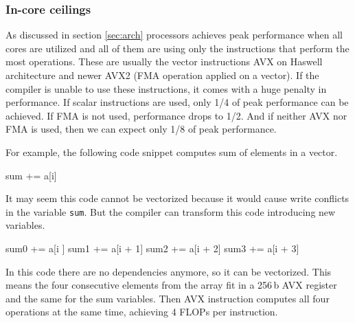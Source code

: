 \subsubsection*{In-core ceilings}


As discussed in section \ref{sec:arch} processors achieves peak performance when all cores are utilized and all of them are using only the instructions that perform the most operations. These are usually the vector instructions AVX on Haswell architecture and newer AVX2 (FMA operation applied on a vector).
If the compiler is unable to use these instructions, it comes with a huge penalty in performance. If scalar instructions are used, only 1/4 of peak performance can be achieved. If FMA is not used, performance drops to 1/2. And if neither AVX nor FMA is used, then we can expect only 1/8 of peak performance.


For example, the following code snippet computes sum of elements in a vector.
\begin{algorithmic}[1]
      \State sum += a[i]
  \EndFor
\end{algorithmic}%
It may seem this code cannot be vectorized because it would cause write conflicts in the variable \texttt{sum}.
But the compiler can transform this code introducing new variables.
\begin{algorithmic}[1]
      \State sum0 += a[i    ]
      \State sum1 += a[i + 1]
      \State sum2 += a[i + 2]
      \State sum3 += a[i + 3]
  \EndFor
\end{algorithmic}%
In this code there are no dependencies anymore, so it can be vectorized.
This means the four consecutive elements from the array fit in a 256\,b AVX register and the same for the sum variables. Then AVX instruction computes all four operations at the same time, achieving 4 FLOPs per instruction.

